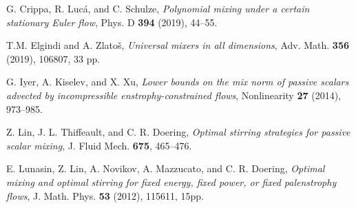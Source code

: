 \documentclass[12pt]{article}
\numberwithin{figure}{section}
\numberwithin{equation}{section}
\begin{document}
\begin{thebibliography}{99}
G. Crippa, R. Luc\'{a}, and C. Schulze,
{\it  Polynomial mixing under a certain stationary Euler flow},
Phys. D {\bf 394} (2019), 44--55.



%
%
%

T.M. Elgindi and A. Zlato\v s, 
{\it Universal mixers in all dimensions}, 
Adv. Math. {\bf 356} (2019), 106807, 33 pp. 

G. Iyer, A. Kiselev, and X. Xu, 
{\it Lower bounds on the mix norm of passive scalars advected by incompressible enstrophy-constrained flows},
Nonlinearity {\bf 27} (2014), 973--985.


Z. Lin, J. L. Thiffeault, and C. R. Doering,
{\it Optimal stirring strategies for passive scalar mixing},
J. Fluid Mech. {\bf 675}, 465--476.


E. Lunasin, Z. Lin, A. Novikov, A. Mazzucato, and C. R. Doering, 
{\it Optimal mixing and optimal stirring for fixed energy, fixed power, or fixed palenstrophy flows},
J. Math. Phys. {\bf 53} (2012), 115611, 15pp.



\end{thebibliography}
\end{document}
